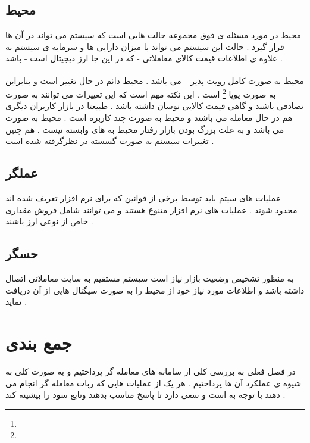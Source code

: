 \subsection{محیط}
محیط در مورد مسئله ی فوق مجموعه حالت هایی است که سیستم می تواند در آن ها قرار گیرد . حالت این سیستم می تواند با میزان دارایی ها و سرمایه ی سیستم به علاوه ی اطلاعات قیمت کالای معاملاتی - که در این جا ارز دیجیتال است - باشد . 
\par 
محیط به صورت کامل رویت پذیر
\footnote{}
می باشد . محیط دائم در حال تغییر است و بنابراین به صورت پویا
\footnote{}
است . این نکته مهم است که این تغییرات می توانند به صورت تصادفی باشند و گاهی قیمت کالایی نوسان داشته باشد . طبیعتا در بازار کاربران دیگری هم در حال معامله می باشند و محیط به صورت چند کاربره است . 
محیط به صورت 
می باشد و به علت بزرگ بودن بازار رفتار محیط به 
های 
وابسته نیست . 
هم چنین تغییرات سیستم به صورت گسسته در نظرگرفته شده است .

\subsection{عملگر}
عملیات های سیتم باید توسط برخی از قوانین که برای نرم افزار تعریف شده اند محدود شوند . عملیات های نرم افزار متنوع هستند و می توانند شامل فروش مقداری خاص از نوعی ارز  باشند .
\subsection{حسگر}
به منظور تشخیص وضعیت بازار نیاز است سیستم مستقیم به سایت معاملاتی اتصال داشته باشد و اطلاعات مورد نیاز خود از محیط را به صورت سیگنال هایی از آن دریافت نماید .
\section{جمع بندی}
در فصل فعلی به بررسی کلی از سامانه  های معامله گر پرداختیم و به صورت کلی به شیوه ی عملکرد آن ها پرداختیم . هر یک از عملیات هایی که ربات معامله گر انجام می دهند با توجه به 
است و سعی دارد تا پاسخ مناسب بدهند وتابع سود را بیشینه کند .





